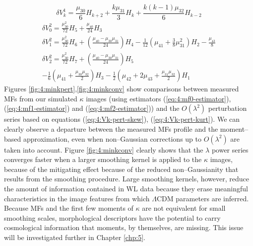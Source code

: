 \begin{equation}
\label{eq:4:Vk-pert-skew}
\delta V^1_k = \frac{\mu_{30}}{6}H_{k+2} + \frac{k\mu_{31}}{3}H_k + \frac{k(k-1)\mu_{32}}{6}H_{k-2}
\end{equation}
%
\begin{equation}
\label{eq:4:Vk-pert-kurt}
\begin{gathered}
\displaystyle \delta V^2_0 = \frac{\mu_{30}^2}{72}H_5 + \frac{\mu_{40}}{24}H_3 \\
\displaystyle \delta V^2_1 = \frac{\mu_{30}^2}{72}H_6 + \left(\frac{\mu_{40}-\mu_{30}\mu_{31}}{24}\right)H_4 - \frac{1}{12}\left(\mu_{41}+\frac{3}{8}\mu_{31}^2\right)H_2 - \frac{\mu_{43}}{8}  \\ 
\displaystyle \delta V^2_2 = \frac{\mu_{30}^2}{72}H_7 + \left(\frac{\mu_{40}-\mu_{30}\mu_{31}}{24}\right)H_5 
\\ - \frac{1}{6}\left(\mu_{41}+\frac{\mu_{30}\mu_{32}}{2}\right)H_3 - \frac{1}{2}\left(\mu_{42}+2\mu_{43}+\frac{\mu_{31}\mu_{32}}{2}\right)H_1 
\end{gathered}
\end{equation}
%
Figures \ref{fig:4:minkpert},\ref{fig:4:minkconv} show comparisons between measured MFs from our simulated $\kappa$ images (using estimators (\ref{eq:4:mf0-estimator}), (\ref{eq:4:mf1-estimator}) and (\ref{eq:4:mf2-estimator})) and the $O(\lambda^2)$ perturbation series based on equations (\ref{eq:4:Vk-pert-skew}), (\ref{eq:4:Vk-pert-kurt}). We can clearly observe a departure between the measured MFs profile and the moment--based approximation, even when non--Gaussian corrections up to $O(\lambda^2)$ are taken into account. Figure \ref{fig:4:minkconv} clearly shows that the $\lambda$ power series converges faster when a larger smoothing kernel is applied to the $\kappa$ images, because of the mitigating effect because of the reduced non--Gaussianity that results from the smoothing procedure. Large smoothing kernels, however, reduce the amount of information contained in WL data because they erase meaningful characteristics in the image features from which $\Lambda$CDM parameters are inferred. Because MFs and the first few moments of $\kappa$ are not equivalent for small smoothing scales, morphological descriptors have the potential to carry cosmological information that moments, by themselves, are missing. This issue will be investigated further in Chapter \ref{chp:5}.    


